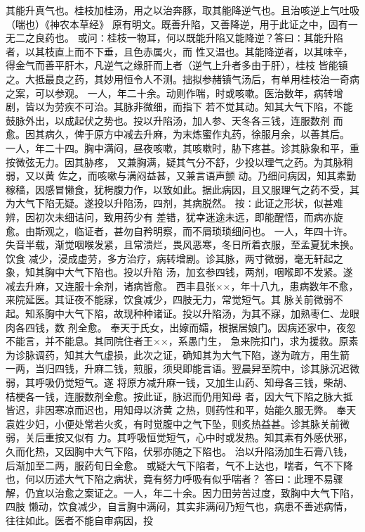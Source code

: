 \documentclass[a4paper,12pt,UTF8,twoside]{ctexbook}
\begin{document}
其能升真气也。桂枝加桂汤，用之以治奔豚，取其能降逆气也。且治咳逆上气吐吸（喘也）《神农本草经》 
原有明文。既善升陷，又善降逆，用于此证之中，固有一无二之良药也。 
或问∶桂枝一物耳，何以既能升陷又能降逆？答曰∶其能升陷者，以其枝直上而不下垂，且色赤属火，而 
性又温也。其能降逆者，以其味辛，得金气而善平肝木，凡逆气之缘肝而上者（逆气上升者多由于肝），桂枝 
皆能镇之。大抵最良之药，其妙用恒令人不测。拙拟参赭镇气汤后，有单用桂枝治一奇病之案，可以参观。 
一人，年二十余。动则作喘，时或咳嗽。医治数年，病转增剧，皆以为劳疾不可治。其脉非微细，而指下 
若不觉其动。知其大气下陷，不能鼓脉外出，以成起伏之势也。投以升陷汤，加人参、天冬各三钱，连服数剂 
而愈。因其病久，俾于原方中减去升麻，为末炼蜜作丸药，徐服月余，以善其后。 
一人，年二十四。胸中满闷，昼夜咳嗽，其咳嗽时，胁下疼甚。诊其脉象和平，重按微弦无力。因其胁疼， 
又兼胸满，疑其气分不舒，少投以理气之药。为其脉稍弱，又以黄 佐之，而咳嗽与满闷益甚，又兼言语声颤 
动。乃细问病因，知其素勤稼穑，因感冒懒食，犹枵腹力作，以致如此。据此病因，且又服理气之药不受，其 
为大气下陷无疑。遂投以升陷汤，四剂，其病脱然。 
按∶此证之形状，似甚难辨，因初次未细诘问，致用药少有 
差错，犹幸迷途未远，即能醒悟，而病亦旋愈。由斯观之，临证者，甚勿自矜明察，而不屑琐琐细问也。 
一人，年四十许。失音半载，渐觉咽喉发紧，且常溃烂，畏风恶寒，冬日所着衣服，至孟夏犹未换。饮食 
减少，浸成虚劳，多方治疗，病转增剧。诊其脉，两寸微弱，毫无轩起之象，知其胸中大气下陷也。投以升陷 
汤，加玄参四钱，两剂，咽喉即不发紧。遂减去升麻，又连服十余剂，诸病皆愈。 
西丰县张××，年十八九，患病数年不愈，来院延医。其证夜不能寐，饮食减少，四肢无力，常觉短气。其 
脉关前微弱不起。知系胸中大气下陷，故现种种诸证。投以升陷汤，为其不寐，加熟枣仁、龙眼肉各四钱，数 
剂全愈。 
奉天于氏女，出嫁而孀，根据居娘门。因病还家中，夜忽不能言，并不能息。其同院住者王××，系愚门生， 
急来院扣门，求为援救。原素为诊脉调药，知其大气虚损，此次之证，确知其为大气下陷，遂为疏方，用生箭 
一两，当归四钱，升麻二钱，煎服，须臾即能言语。翌晨舁至院中，诊其脉沉迟微弱，其呼吸仍觉短气。遂 
将原方减升麻一钱，又加生山药、知母各三钱，柴胡、桔梗各一钱，连服数剂全愈。按此证，脉迟而仍用知母 
者，因大气下陷之脉大抵皆迟，非因寒凉而迟也，用知母以济黄 之热，则药性和平，始能久服无弊。 
奉天袁姓少妇，小便处常若火炙，有时觉腹中之气下坠，则炙热益甚。诊其脉关前微弱，关后重按又似有 
力。其呼吸恒觉短气，心中时或发热。知其素有外感伏邪，久而化热，又因胸中大气下陷，伏邪亦随之下陷也。 
治以升陷汤加生石膏八钱，后渐加至二两，服药旬日全愈。 
或疑大气下陷者，气不上达也，喘者，气不下降也，何以历述大气下陷之病状，竟有努力呼吸有似乎喘者？ 
答曰∶此理不易骤解，仍宜以治愈之案证之。一人，年二十余。因力田劳苦过度，致胸中大气下陷，四肢 
懒动，饮食减少，自言胸中满闷，其实非满闷乃短气也，病患不善述病情，往往如此。医者不能自审病因，投 
\end{document}
